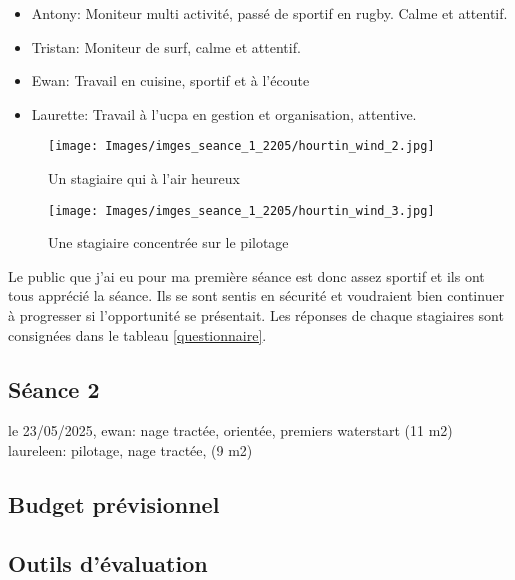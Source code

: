 \documentclass[12pt,a4paper]{report}
\begin{document}
\begin{itemize}
\item Antony: Moniteur multi activité, passé de sportif en rugby. Calme et attentif.
\item Tristan: Moniteur de surf, calme et attentif.
\item Ewan: Travail en cuisine, sportif et à l'écoute
\item Laurette: Travail à l'ucpa en gestion et organisation, attentive.
\end{itemize}
\begin{figure}
\begin{minipage}{0.4\textwidth}
\texttt{[image: Images/imges\_seance\_1\_2205/hourtin\_wind\_2.jpg]} 
\caption{Un stagiaire qui à l'air heureux}
\end{minipage}
\hfill
\begin{minipage}{0.4\textwidth}
\texttt{[image: Images/imges\_seance\_1\_2205/hourtin\_wind\_3.jpg]} 
\caption{Une stagiaire concentrée sur le pilotage}
\end{minipage}
\end{figure}
Le public que j'ai eu pour ma première séance est donc assez sportif
et ils ont tous apprécié la séance. Ils se sont sentis en sécurité
et voudraient bien continuer à progresser si l'opportunité se présentait.
Les réponses de chaque stagiaires sont consignées dans le tableau \ref{questionnaire}.
\subsection{Séance 2}

le 23/05/2025, 
ewan: nage tractée, orientée, premiers waterstart (11 m2)
laureleen: pilotage, nage tractée, (9 m2)


\subsection{Budget prévisionnel}
\subsection{Outils d'évaluation}
\end{document}
